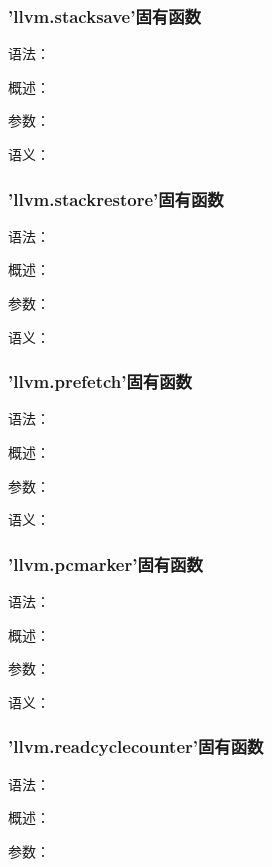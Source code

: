 \documentclass[12pt,a4paper]{article}
\begin{document}
{%

\subsubsection{'llvm.stacksave'固有函数} %

语法：

概述：

参数：

语义：


\subsubsection{'llvm.stackrestore'固有函数} %

语法：

概述：

参数：

语义：


\subsubsection{'llvm.prefetch'固有函数} %

语法：

概述：

参数：

语义：


\subsubsection{'llvm.pcmarker'固有函数} %

语法：

概述：

参数：

语义：


\subsubsection{'llvm.readcyclecounter'固有函数} %

语法：

概述：

参数：

}
\end{document}
